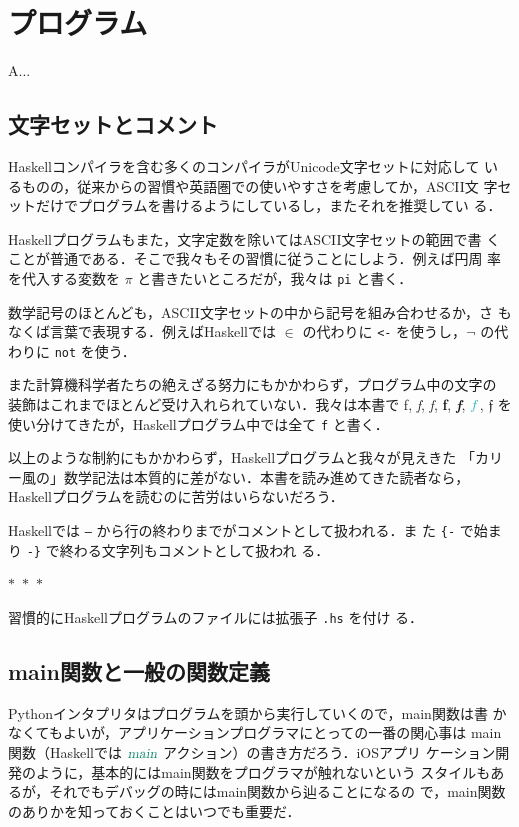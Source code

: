 \documentclass[a5paper,twoside,fleqn,draft]{jsbook}
\def\funcColor{BlueGreen}
\def\actionColor{PineGreen}
\newcommand{\separator}{\begin{center}$*$~$*$~$*$\end{center}}
\newcommand{\programminglanguage}[1]{\textsf{#1}}
\newcommand{\haskell}{\programminglanguage{Haskell}}
\newcommand{\python}{\programminglanguage{Python}}
\newenvironment{leader}{\begingroup\gt}{\endgroup}
\newcommand{\code}[1]{\texttt{#1}}
\newcommand{\filename}[1]{\texttt{#1}}
\newcommand{\mFunc}[1]{\textcolor{\funcColor}{#1}}
\newcommand{\mFFunc}{{\mFunc{f}}}
\newcommand{\mActionLong}[1]{\textcolor{\actionColor}{\textsl{#1}}}
\DeclareMathOperator{\mMain}{\mActionLong{main}}
\DeclareMathOperator{\mFrom}{\in}
\begin{document}
\chapter{プログラム}
\label{ch:program}

\begin{leader}
A...
\end{leader}

\section{文字セットとコメント}

\haskell コンパイラを含む多くのコンパイラがUnicode文字セットに対応して
いるものの，従来からの習慣や英語圏での使いやすさを考慮してか，ASCII文
字セットだけでプログラムを書けるようにしているし，またそれを推奨してい
る．

\haskell プログラムもまた，文字定数を除いてはASCII文字セットの範囲で書
くことが普通である．そこで我々もその習慣に従うことにしよう．例えば円周
率を代入する変数を $\pi$ と書きたいところだが，我々は \code{pi} と書く．

数学記号のほとんども，ASCII文字セットの中から記号を組み合わせるか，さ
もなくば言葉で表現する．例えば\haskell では $\mFrom$ の代わりに
\code{<-} を使うし，$\neg$ の代わりに \code{not} を使う．

また計算機科学者たちの絶えざる努力にもかかわらず，プログラム中の文字の
装飾はこれまでほとんど受け入れられていない．我々は本書で \textrm{f},
\textit{f}, \textsl{f}, \textbf{f}, \textbf{\textit{f}}, $\mFFunc$,
$\mathfrak{f}$ を使い分けてきたが，\haskell プログラム中では全て
\code{f} と書く．

以上のような制約にもかかわらず，\haskell プログラムと我々が見えきた
「カリー風の」数学記法は本質的に差がない．本書を読み進めてきた読者なら，
\haskell プログラムを読むのに苦労はいらないだろう．

\haskell では \code{--} から行の終わりまでがコメントとして扱われる．ま
た \code{\{-} で始まり \code{-\}} で終わる文字列もコメントとして扱われ
る．

\separator

習慣的に\haskell プログラムのファイルには拡張子 \filename{.hs} を付け
る．

\section{main関数と一般の関数定義}

\python インタプリタはプログラムを頭から実行していくので，main関数は書
かなくてもよいが，アプリケーションプログラマにとっての一番の関心事は
main関数（\haskell では $\mMain$ アクション）の書き方だろう．iOSアプリ
ケーション開発のように，基本的にはmain関数をプログラマが触れないという
スタイルもあるが，それでもデバッグの時にはmain関数から辿ることになるの
で，main関数のありかを知っておくことはいつでも重要だ．
\end{document}
